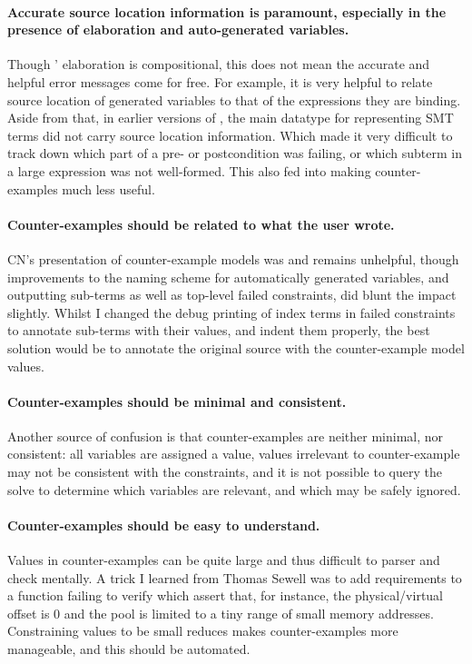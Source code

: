 \paragraph{Accurate source location information is paramount, especially in the
presence of elaboration and auto-generated variables.} Though '
elaboration is compositional, this does not mean the accurate and helpful error
messages come for free. For example, it is very helpful to relate source
location of generated variables to that of the expressions they are
binding. Aside from that, in earlier versions of , the main datatype
for representing SMT terms did not carry source location information. Which
made it very difficult to track down which part of a pre- or postcondition was
failing, or which subterm in a large expression was not well-formed. This also
fed into making counter-examples much less useful.

\paragraph{Counter-examples should be related to what the user wrote.} CN's
presentation of counter-example models was and remains unhelpful, though
improvements to the naming scheme for automatically generated variables, and
outputting sub-terms as well as top-level failed constraints, did blunt the
impact slightly. Whilst I changed the debug printing of index terms in failed
constraints to annotate sub-terms with their values, and indent them properly,
the best solution would be to annotate the original source with the
counter-example model values.

\paragraph{Counter-examples should be minimal and consistent.} Another source
of confusion is that counter-examples are neither minimal, nor consistent: all
variables are assigned a value, values irrelevant to counter-example may not be
consistent with the constraints, and it is not possible to query the solve to
determine which variables are relevant, and which may be safely ignored.

\paragraph{Counter-examples should be easy to understand.} Values in
counter-examples can be quite large and thus difficult to parser and check
mentally. A trick I learned from Thomas Sewell was to add requirements to a
function failing to verify which assert that, for instance, the
physical/virtual offset is 0 and the pool is limited to a tiny range of small
memory addresses. Constraining values to be small reduces makes
counter-examples more manageable, and this should be automated.

